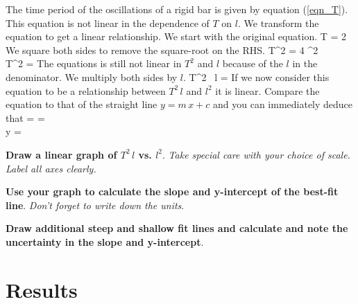 \documentclass{article}
\begin{document}
      The time period of the oscillations of a rigid bar is given by equation (\ref{eqn_T}). This equation is not linear in the dependence of $T$ on $l$. We transform the equation to get a linear relationship. We start with the original equation.
%
      \beqn
         T = 2 \pi {}
      \eeqn
      We square both sides to remove the square-root on the RHS.
      \beqsn
         T^2 = 4 \pi^2  \\[0.25\baselineskip]
         \imply T^2 =  
      \eeqsn
      The equations is still not linear in $T^2$ and $l$ because of the $l$ in the denominator. We multiply both sides by $l$.
      \beq
         T^2 \, l =  
      \eeq
      If we now consider this equation to be a relationship between $T^2 \, l$ and $l^2$ it is linear. Compare the equation to that of the straight line $y = m \, x + c$ and you can immediately deduce that
      \beqc \label{graph}
          =  = \\[0.5\baselineskip]
         y = 
      \eeqc

      \textbf{Draw a linear graph of $T^2 \, l$ vs. $l^2$}. \textit{Take special care with your choice of scale. Label all axes clearly.}

      \textbf{Use your graph to calculate the slope and y-intercept of the best-fit line}. \textit{Don't forget to write down the units}.

      \textbf{Draw additional steep and shallow fit lines and calculate and note the uncertainty in the slope and y-intercept}.


   \section*{Results}
\end{document}
